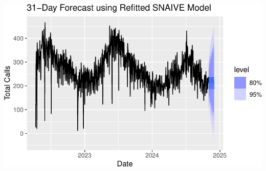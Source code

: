 \documentclass[
  letterpaper,
  DIV=11,
  numbers=noendperiod]{scrartcl}
\begin{document}
\includegraphics{final_proj_group1_files/figure-pdf/unnamed-chunk-21-1.pdf}
\end{document}

